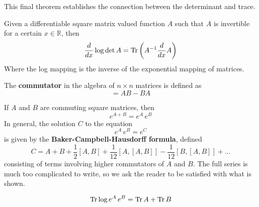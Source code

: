   This final theorem establishes the connection between the determinant and trace. 

  \begin{theorem}
    Given a differentiable square matrix valued function $A$ such that $A$ is invertible for a certain $x \in \mathbb{R}$, then 
    \begin{equation}
      \frac{d}{d x} \log{\det{A}} = \Tr \bigg( A^{-1} \frac{d}{d x} A \bigg)
    \end{equation}
    Where the log mapping is the inverse of the exponential mapping of matrices. 
  \end{theorem}

  \begin{definition}
    The \textbf{commutator} in the algebra of $n \times n$ matrices is defined as 
    \begin{equation}
      [A, B] = A B - B A
    \end{equation}
  \end{definition}

  \begin{theorem}
    If $A$ and $B$ are commuting square matrices, then 
    \begin{equation}
      e^{A + B} = e^A \, e^B
    \end{equation}
    In general, the solution $C$ to the equation
    \begin{equation}
      e^{A} \, e^B = e^C
    \end{equation}
    is given by the \textbf{Baker-Campbell-Hausdorff formula}, defined
    \begin{equation}
      C = A + B + \frac{1}{2}[A,B] + \frac{1}{12} [A,[A,B]] - \frac{1}{12} [B,[A,B]] + \ldots
    \end{equation}
    consisting of terms involving higher commutators of $A$ and $B$. The full series is much too complicated to write, so we ask the reader to be satisfied with what is shown. 
  \end{theorem}

  \begin{corollary}
    \begin{equation}
      \Tr{\log{e^A \, e^B}} = \Tr{A} + \Tr{B}
    \end{equation}
  \end{corollary}


